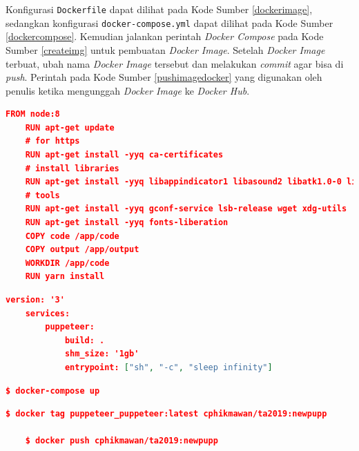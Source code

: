 			\indent Konfigurasi \texttt{Dockerfile} dapat dilihat pada Kode Sumber \ref{dockerimage}, sedangkan konfigurasi \texttt{docker-compose.yml} dapat dilihat pada Kode Sumber \ref{dockercompose}. Kemudian jalankan perintah \textit{Docker Compose} pada Kode Sumber \ref{createimg} untuk pembuatan \textit{Docker Image}. Setelah \textit{Docker Image} terbuat, ubah nama \textit{Docker Image} tersebut dan melakukan \textit{commit} agar bisa di \textit{push}. Perintah pada Kode Sumber \ref{pushimagedocker} yang digunakan oleh penulis ketika mengunggah \textit{Docker Image} ke \textit{Docker Hub}.
				\begin{lstlisting}[frame=single,tabsize=2,breaklines,caption={Konfigurasi \textit{Dockerfile} },label=dockerimage, captionpos=b, language=json]
	FROM node:8
	RUN apt-get update
	# for https
	RUN apt-get install -yyq ca-certificates
	# install libraries
	RUN apt-get install -yyq libappindicator1 libasound2 libatk1.0-0 libc6 libcairo2 libcups2 libdbus-1-3 libexpat1 libfontconfig1 libgcc1 libgconf-2-4 libgdk-pixbuf2.0-0 libglib2.0-0 libgtk-3-0 libnspr4 libnss3 libpango-1.0-0 libpangocairo-1.0-0 libstdc++6 libx11-6 libx11-xcb1 libxcb1 libxcomposite1 libxcursor1 libxdamage1 libxext6 libxfixes3 libxi6 libxrandr2 libxrender1 libxss1 libxtst6
	# tools
	RUN apt-get install -yyq gconf-service lsb-release wget xdg-utils
	RUN apt-get install -yyq fonts-liberation 
	COPY code /app/code
	COPY output /app/output
	WORKDIR /app/code
	RUN yarn install
				\end{lstlisting}
				
				\begin{lstlisting}[frame=single,tabsize=2,breaklines,caption={Konfigurasi \textit{docker-compose.yml} },label=dockercompose, captionpos=b, language=json]
	version: '3'
	services:
		puppeteer:
			build: .
			shm_size: '1gb'
			entrypoint: ["sh", "-c", "sleep infinity"]
				\end{lstlisting}
				
				\begin{lstlisting}[frame=single,tabsize=2,breaklines,caption={Perintah untuk menjalankan  \textit{Docker Compose}},label=createimg, captionpos=b, language=json,numbers=none]
	$ docker-compose up
				\end{lstlisting}
				
				\begin{lstlisting}[frame=single,tabsize=2,breaklines,caption={Perintah untuk mengunggah \textit{Docker Image}},label=pushimagedocker, captionpos=b, language=json,numbers=none]
	$ docker tag puppeteer_puppeteer:latest cphikmawan/ta2019:newpupp
	
	$ docker push cphikmawan/ta2019:newpupp
				\end{lstlisting}
				
